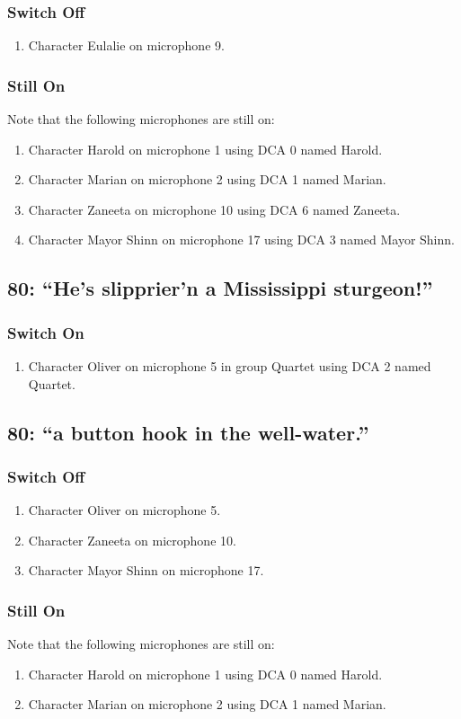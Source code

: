 \subsubsection* {Switch Off}
\begin{enumerate}
\item Character Eulalie on microphone 9.
\end{enumerate}
\subsubsection* {Still On}
Note that the following microphones are still on:
\begin{enumerate}
\item Character Harold on microphone 1 using DCA 0 named Harold.
\item Character Marian on microphone 2 using DCA 1 named Marian.
\item Character Zaneeta on microphone 10 using DCA 6 named Zaneeta.
\item Character Mayor Shinn on microphone 17 using DCA 3 named Mayor Shinn.
\end{enumerate}
\subsection* {80: ``He's slipprier'n a Mississippi sturgeon!''}
\subsubsection* {Switch On}
\begin{enumerate}
\item Character Oliver on microphone 5 in group Quartet using DCA 2 named Quartet.
\end{enumerate}
\subsection* {80: ``a button hook in the well-water.''}
\subsubsection* {Switch Off}
\begin{enumerate}
\item Character Oliver on microphone 5.
\item Character Zaneeta on microphone 10.
\item Character Mayor Shinn on microphone 17.
\end{enumerate}
\subsubsection* {Still On}
Note that the following microphones are still on:
\begin{enumerate}
\item Character Harold on microphone 1 using DCA 0 named Harold.
\item Character Marian on microphone 2 using DCA 1 named Marian.
\end{enumerate}
